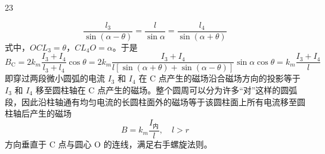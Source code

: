 \begin{solution}{23}
\begin{subsolution}
        \begin{equation}
            \frac{l_3}{\sin(\alpha - \theta)} = \frac{l}{\sin\alpha} = \frac{l_4}{\sin(\alpha + \theta)}
            \label{eq:22.s23}
        \end{equation}
        式中，$OCL_3 = \theta$，$CL_4O = \alpha$。于是
        \begin{equation}
            B_{\mathrm{C}} = 2k_m\frac{I_3 + I_4}{l_3 + l_4}\cos\theta = 2k_m\frac{I_3 + I_4}{l[\sin(\alpha + \theta) + \sin(\alpha - \theta)]}\sin\alpha\cos\theta = k_m\frac{I_3 + I_4}{l}
            \label{eq:23.s23}
        \end{equation}
        即穿过两段微小圆弧的电流 $I_3$ 和 $I_4$ 在 C 点产生的磁场沿合磁场方向的投影等于 $I_3$ 和 $I_4$ 移至圆柱轴在 C 点产生的磁场。整个圆周可以分为许多“对”这样的圆弧段，因此沿柱轴通有均匀电流的长圆柱面外的磁场等于该圆柱面上所有电流移至圆柱轴后产生的磁场
        \begin{equation}
            B = k_m\frac{I_{\text{内}}}{l}, \quad l > r
            \label{eq:24.s23}
        \end{equation}
        方向垂直于 C 点与圆心 O 的连线，满足右手螺旋法则。
    \end{subsolution}
\end{solution}